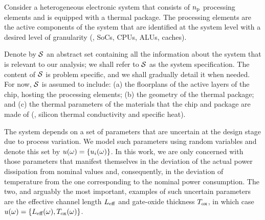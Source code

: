 Consider a heterogeneous electronic system that consists of ${n_\text{p}}$ processing elements and is equipped with a thermal package.
The processing elements are the active components of the system that are identified at the system level with a desired level of granularity (\eg, SoCs, CPUs, ALUs, caches).

Denote by $\mathcal{S}$ an abstract set containing all the information about the system that is relevant to our analysis; we shall refer to $\mathcal{S}$ as the system specification.
The content of $\mathcal{S}$ is problem specific, and we shall gradually detail it when needed.
For now, $\mathcal{S}$ is assumed to include: (a) the floorplans of the active layers of the chip, hosting the processing elements; (b) the geometry of the thermal package; and (c) the thermal parameters of the materials that the chip and package are made of (\eg, silicon thermal conductivity and specific heat).

The system depends on a set of parameters that are uncertain at the design stage due to process variation.
We model such parameters using random variables and denote this set by $u(\omega) = \{ u_i(\omega) \}$.
In this work, we are only concerned with those parameters that manifest themselves in the deviation of the actual power dissipation from nominal values and, consequently, in the deviation of temperature from the one corresponding to the nominal power consumption.
The two, and arguably the most important, examples of such uncertain parameters are the effective channel length $L_\text{eff}$ and gate-oxide thickness $T_\text{ox}$, in which case $u(\omega) = \{ L_\text{eff}(\omega), T_\text{ox}(\omega) \}$.
